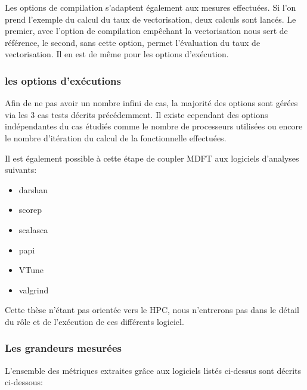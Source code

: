 Les options de compilation s'adaptent également aux mesures effectuées. Si l'on prend l'exemple du calcul du taux de vectorisation, deux calculs sont lancés. Le premier, avec l'option de compilation empêchant la vectorisation nous sert de référence, le second, sans cette option, permet l'évaluation du taux de vectorisation. Il en est de même pour les options d'exécution.


\subsubsection{ les options d'exécutions }
Afin de ne pas avoir un nombre infini de cas, la majorité des options sont gérées via les 3 cas tests décrits précédemment. Il existe cependant des options indépendantes du cas étudiés comme le nombre de processeurs utilisées ou encore le nombre d’itération du calcul de la fonctionnelle effectuées.

Il est également possible à cette étape de coupler MDFT aux logiciels d'analyses suivants:
\begin{itemize}
\item darshan
\item scorep
\item scalasca
\item papi
\item VTune
\item valgrind
\end{itemize}
Cette thèse n'étant pas orientée vers le HPC, nous n'entrerons pas dans le détail du rôle et de l’exécution de ces différents logiciel.


\subsubsection{ Les grandeurs mesurées }
L'ensemble des métriques extraites grâce aux logiciels listés ci-dessus sont décrits ci-dessous:

